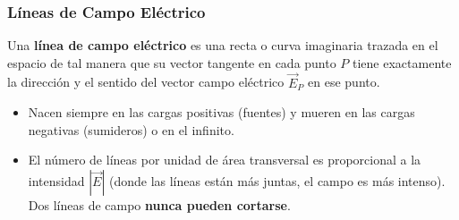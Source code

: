 \subsubsection{Líneas de Campo Eléctrico}
Una \textbf{línea de campo eléctrico} es una recta o curva imaginaria trazada en el espacio de tal manera que su vector tangente en cada punto $P$ tiene exactamente la dirección y el sentido del vector campo eléctrico $\vec{E}_P$ en ese punto.
\begin{itemize}[leftmargin=*]
    \item Nacen siempre en las cargas positivas (fuentes) y mueren en las cargas negativas (sumideros) o en el infinito.
    \item El número de líneas por unidad de área transversal es proporcional a la intensidad $|\vec{E}|$ (donde las líneas están más juntas, el campo es más intenso). Dos líneas de campo \textbf{nunca pueden cortarse}.
\end{itemize}

